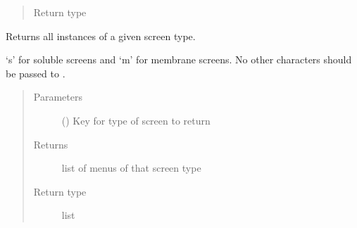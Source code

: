 \documentclass[letterpaper,10pt,english]{sphinxmanual}
\begin{document}
\begin{fulllineitems}
\begin{fulllineitems}
\begin{quote}
\begin{description}
\item[{Return type}] \leavevmode
{\hyperref[\detokenize{polo.utils:polo.utils.io_utils.Menu}]{}}

\end{description}\end{quote}

\end{fulllineitems}


\begin{fulllineitems}
\label{\detokenize{polo.utils:polo.utils.io_utils.BarTender.get_menus_by_type}}
Returns all {\hyperref[\detokenize{polo.utils:polo.utils.io_utils.Menu}]{}} instances of a given screen type.

‘s’ for soluble screens and ‘m’ for membrane screens. No other
characters should be passed to .
\begin{quote}\begin{description}
\item[{Parameters}] \leavevmode
{} (\sphinxstyleliteralemphasis{\sphinxupquote{ (}}\sphinxstyleliteralemphasis{\sphinxupquote{)}}) \textendash{} Key for type of screen to return

\item[{Returns}] \leavevmode
list of menus of that screen type

\item[{Return type}] \leavevmode
list

\end{description}\end{quote}

\end{fulllineitems}


\end{fulllineitems}

\end{document}
